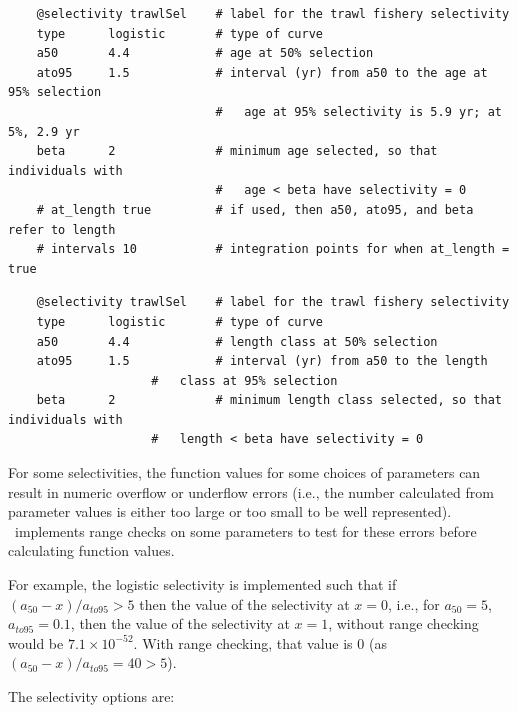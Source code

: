 \ifAgeBased
{\small{\begin{verbatim}
	@selectivity trawlSel    # label for the trawl fishery selectivity
	type      logistic       # type of curve
	a50       4.4            # age at 50% selection
	ato95     1.5            # interval (yr) from a50 to the age at 95% selection
	                         #   age at 95% selectivity is 5.9 yr; at 5%, 2.9 yr
	beta      2              # minimum age selected, so that individuals with 
	                         #   age < beta have selectivity = 0
	# at_length true         # if used, then a50, ato95, and beta refer to length
	# intervals 10			 # integration points for when at_length = true
\end{verbatim}}}
\else
{\small{\begin{verbatim}
	@selectivity trawlSel    # label for the trawl fishery selectivity
	type      logistic       # type of curve
	a50       4.4            # length class at 50% selection
	ato95     1.5            # interval (yr) from a50 to the length
                    #   class at 95% selection
	beta      2              # minimum length class selected, so that individuals with 
                    #   length < beta have selectivity = 0
\end{verbatim}}}
\fi

For some selectivities, the function values for some choices of parameters can result in numeric overflow or underflow errors (i.e., the number calculated from parameter values is either too large or too small to be well represented). \CNAME\ implements range checks on some parameters to test for these errors before calculating function values.

For example, the logistic selectivity is implemented such that if $(a_{50}-x)/a_{to95} > 5$ then the value of the selectivity at $x=0$, i.e., for $a_{50}=5$, $a_{to95}=0.1$, then the value of the selectivity at $x=1$, without range checking would be $7.1 \times 10^{-52}$. With range checking, that value is $0$ (as $(a_{50}-x)/a_{to95}=40 > 5$).

The selectivity options are:

